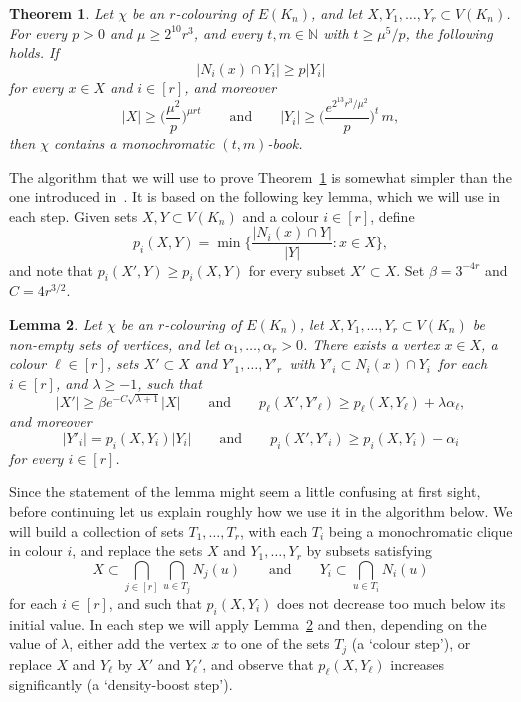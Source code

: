 \documentclass[12pt,reqno]{amsart}
\newtheorem{theorem}{Theorem}[section]
\newtheorem{lemma}[theorem]{Lemma}
\theoremstyle{definition}
\theoremstyle{remark}
\newcommand\N{\mathbb{N}}
\renewcommand{\ge}{\geqslant}
\def\N{\mathbb{N}}
\begin{document}
\begin{theorem}\label{thm:book}
Let\/ $\chi$ be an\/ $r$-colouring of\/ $E(K_n)$, and let\/ $X,Y_1,\ldots,Y_r \subset V(K_n)$. %
For every $p > 0$ and $\mu \ge 2^{10} r^3$, and every $t,m \in \N$ with $t \ge \mu^5 / p$, the following holds. If 
$$|N_i(x) \cap Y_i| \ge p|Y_i|$$
for every $x \in X$ and $i \in [r]$, and moreover
$$|X| \ge \bigg( \frac{\mu^2}{p} \bigg)^{\mu r t} \qquad \text{and} \qquad |Y_i| \ge \bigg( \frac{e^{2^{13} r^3 / \mu^2}}{p} \bigg)^t \, m,$$ 
then $\chi$ contains a monochromatic $(t,m)$-book.
\end{theorem}


The algorithm that we will use to prove Theorem~\ref{thm:book} is somewhat simpler than the one introduced in~\cite{CGMS}. It is based on the following key lemma, which we will use in each step. Given sets $X,Y \subset V(K_n)$ and a colour $i \in [r]$, define 
$$p_i(X,Y) = \min\bigg\{ \frac{|N_i(x) \cap Y|}{|Y|} : x \in X \bigg\},$$
and note that $p_i(X',Y) \ge p_i(X,Y)$ for every subset $X' \subset X$. Set $\beta = 3^{-4r}$ and $C = 4r^{3/2}$.
 
\begin{lemma}\label{key:lemma}
Let\/ $\chi$ be an\/ $r$-colouring of\/ $E(K_n)$, let\/ $X,Y_1,\ldots,Y_r \subset V(K_n)$ be non-empty sets of vertices, and let $\alpha_1,\ldots,\alpha_r > 0$. There exists a vertex $x \in X$, a colour $\ell \in [r]$, sets $X' \subset X$ and\/ $Y'_1,\ldots,Y'_r\,$ with\/ $Y'_i \subset N_i(x) \cap Y_i\,$ for each $i \in [r]$, and\/ $\lambda \ge -1$, such that 
\begin{equation}\label{eq:key:ell}
|X'| \ge \beta e^{- C \sqrt{\lambda + 1}} |X| \qquad \text{and} \qquad p_\ell( X', Y'_\ell ) \ge p_\ell(X,Y_\ell) + \lambda \alpha_\ell,
\end{equation}
and moreover
\begin{equation}\label{eq:key:alli}
|Y'_i| = p_i(X,Y_i) |Y_i| \qquad \text{and} \qquad p_i( X', Y'_i ) \ge p_i(X,Y_i) - \alpha_i
\end{equation}
for every $i \in [r]$.
\end{lemma}

Since the statement of the lemma might seem a little confusing at first sight, before continuing let us explain roughly how we use it in the algorithm below. We will build a collection of sets $T_1,\ldots,T_r$, with each $T_i$ being a monochromatic clique in colour $i$, and replace the sets $X$ and $Y_1,\ldots,Y_r$ by subsets satisfying
$$X \subset \bigcap_{j \in [r]} \bigcap_{u \in T_j} N_j(u) \qquad \text{and} \qquad Y_i \subset \bigcap_{u \in T_i} N_i(u)$$
for each $i \in [r]$, and such that $p_i(X,Y_i)$ does not decrease too much below its initial value. In each step we will apply Lemma~\ref{key:lemma} and then, depending on the value of $\lambda$, either add the vertex $x$ to one of the sets $T_j$ (a `colour step'), or replace $X$ and $Y_\ell$ by $X'$ and $Y_\ell'$, and observe that $p_\ell(X,Y_\ell)$ increases significantly (a `density-boost step'). 
\end{document}
